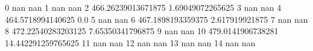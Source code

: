 0 nan nan
1 nan nan
2 466.26239013671875 1.69049072265625
3 nan nan
4 464.5718994140625 0.0
5 nan nan
6 467.1898193359375 2.617919921875
7 nan nan
8 472.22540283203125 7.65350341796875
9 nan nan
10 479.0141906738281 14.442291259765625
11 nan nan
12 nan nan
13 nan nan
14 nan nan
